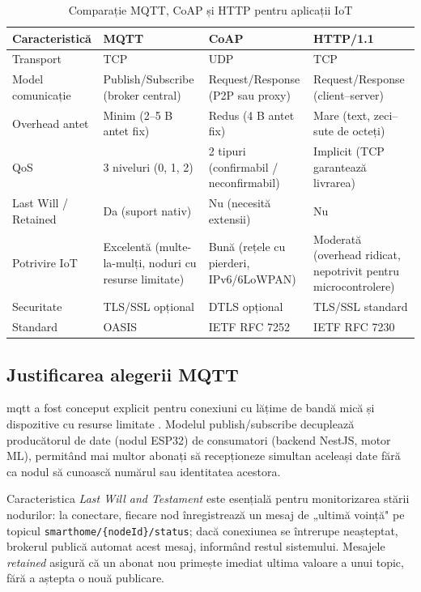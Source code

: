 \begin{table}[H]
\centering
\caption{Comparație MQTT, CoAP și HTTP pentru aplicații IoT}
\label{tab:protocoale}
\begin{tabular}{@{}p{3.2cm} p{3.8cm} p{3.8cm} p{3.8cm}@{}}
\toprule
\textbf{Caracteristică} & \textbf{MQTT} & \textbf{CoAP} & \textbf{HTTP/1.1} \\
\midrule
Transport            & TCP           & UDP           & TCP \\
\addlinespace
Model comunicație    & Publish/Subscribe (broker central) & Request/Response (P2P sau proxy) & Request/Response (client–server) \\
\addlinespace
Overhead antet       & Minim (2–5 B antet fix) & Redus (4 B antet fix) & Mare (text, zeci–sute de octeți) \\
\addlinespace
QoS                  & 3 niveluri (0, 1, 2) & 2 tipuri (confirmabil / neconfirmabil) & Implicit (TCP garantează livrarea) \\
\addlinespace
Last Will / Retained & Da (suport nativ) & Nu (necesită extensii) & Nu \\
\addlinespace
Potrivire IoT        & Excelentă (multe-la-mulți, noduri cu resurse limitate) & Bună (rețele cu pierderi, IPv6/6LoWPAN) & Moderată (overhead ridicat, nepotrivit pentru microcontrolere) \\
\addlinespace
Securitate           & TLS/SSL opțional & DTLS opțional & TLS/SSL standard \\
\addlinespace
Standard             & OASIS \cite{oasis2019mqtt} & IETF RFC 7252 \cite{rfc7252} & IETF RFC 7230 \\
\bottomrule
\end{tabular}
\end{table}

\subsection{Justificarea alegerii MQTT}

\gls{mqtt} a fost conceput explicit pentru conexiuni cu lățime de bandă mică și dispozitive
cu resurse limitate \cite{oasis2019mqtt}. Modelul publish/subscribe decuplează producătorul
de date (nodul ESP32) de consumatori (backend NestJS, motor ML), permitând mai multor
abonați să recepționeze simultan aceleași date fără ca nodul să cunoască numărul sau
identitatea acestora.

Caracteristica \emph{Last Will and Testament} este esențială pentru monitorizarea stării
nodurilor: la conectare, fiecare nod înregistrează un mesaj de „ultimă voință" pe topicul
\texttt{smarthome/\{nodeId\}/status}; dacă conexiunea se întrerupe neașteptat, brokerul
publică automat acest mesaj, informând restul sistemului. Mesajele \emph{retained} asigură
că un abonat nou primește imediat ultima valoare a unui topic, fără a aștepta o nouă
publicare.


